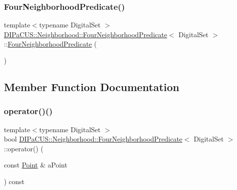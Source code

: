 \subsubsection{\texorpdfstring{Four\+Neighborhood\+Predicate()}{FourNeighborhoodPredicate()}\hspace{0.1cm}{\footnotesize\ttfamily [2/2]}}
{\footnotesize\ttfamily template$<$typename Digital\+Set $>$ \\
\mbox{\hyperlink{classDIPaCUS_1_1Neighborhood_1_1FourNeighborhoodPredicate}{D\+I\+Pa\+C\+U\+S\+::\+Neighborhood\+::\+Four\+Neighborhood\+Predicate}}$<$ Digital\+Set $>$\+::\mbox{\hyperlink{classDIPaCUS_1_1Neighborhood_1_1FourNeighborhoodPredicate}{Four\+Neighborhood\+Predicate}} (\begin{DoxyParamCaption}{ }\end{DoxyParamCaption})\hspace{0.3cm}{\ttfamily [protected]}}



\subsection{Member Function Documentation}
\mbox{\label{classDIPaCUS_1_1Neighborhood_1_1FourNeighborhoodPredicate_a035980ee392a3565d219e6f3c8229af9}} 
\subsubsection{\texorpdfstring{operator()()}{operator()()}\hspace{0.1cm}{\footnotesize\ttfamily [1/2]}}
{\footnotesize\ttfamily template$<$typename Digital\+Set $>$ \\
bool \mbox{\hyperlink{classDIPaCUS_1_1Neighborhood_1_1FourNeighborhoodPredicate}{D\+I\+Pa\+C\+U\+S\+::\+Neighborhood\+::\+Four\+Neighborhood\+Predicate}}$<$ Digital\+Set $>$\+::operator() (\begin{DoxyParamCaption}\item[{const \mbox{\hyperlink{classDIPaCUS_1_1Neighborhood_1_1FourNeighborhoodPredicate_abc0e0bbbb71884290b4b61935c296230}{Point}} \&}]{a\+Point }\end{DoxyParamCaption}) const\hspace{0.3cm}{\ttfamily [inline]}}

